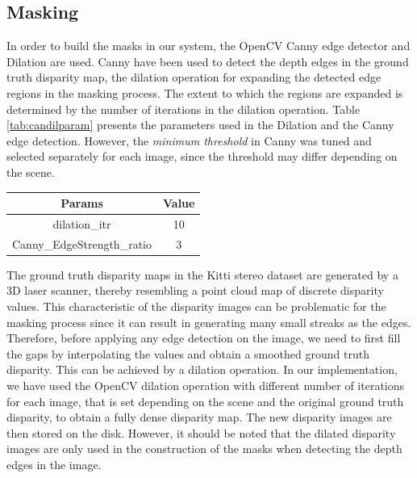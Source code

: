 \subsection{Masking}
In order to build the masks in our system, the OpenCV Canny edge detector and Dilation are used.
Canny have been used to detect the depth edges in the ground truth disparity map, the dilation operation 
for expanding the detected edge regions in the masking process. The extent to which the regions are expanded
is determined by the number of iterations in the dilation operation. Table \ref{tab:candilparam} presents the parameters used in the Dilation
and the Canny edge detection. However, the \textit{minimum threshold} in Canny was tuned and selected separately for each image, 
since the threshold may differ depending on the scene.

{\footnotesize
\begin{minipage}{\linewidth}
\begin{center}
\label{tab:candilparam}
\begin{tabular}{ |c|c| }
\hline
\textbf{Params} & \textbf{Value} \\ \hline
dilation\_itr & 10 \\  \hline
Canny\_EdgeStrength\_ratio & 3 \\ \hline
\end{tabular}
\end{center}
\end{minipage} \newline
}

The ground truth disparity maps in the Kitti stereo dataset are generated by a 3D laser scanner, thereby resembling
a point cloud map of discrete disparity values. This characteristic of the disparity images 
can be problematic for the masking process since it can result in generating many small streaks as the edges.
Therefore, before applying any edge
detection on the image, we need to first fill the gaps by interpolating the values and obtain a smoothed ground truth disparity.
This can be achieved by a dilation operation.
In our implementation, we have used the OpenCV dilation operation with different number of iterations for each image, that is set depending on the scene 
and the original ground truth disparity, to obtain a fully dense disparity map. 
The new disparity images are then stored on the disk. 
However, it should be noted that the dilated disparity images are only used in the construction of the masks when detecting the depth
edges in the image.

